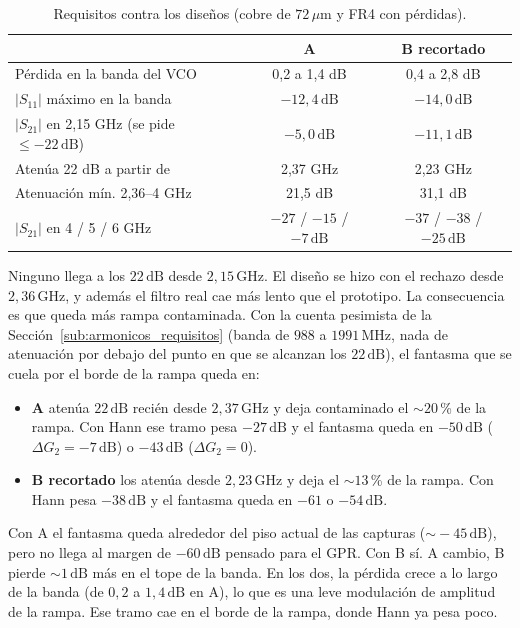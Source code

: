 \begin{table}[htbp]
  \centering
  \caption{Requisitos contra los diseños (cobre de $72\,\mu\text{m}$ y FR4 con
  pérdidas).}
  \label{tab:frf_resultado}
  \begin{tabular}{lcc}
    \toprule
    & A & B recortado \\
    \midrule
    Pérdida en la banda del VCO & 0,2 a 1,4 dB & 0,4 a 2,8 dB \\
    $|S_{11}|$ máximo en la banda & $-12{,}4\,\text{dB}$ & $-14{,}0\,\text{dB}$ \\
    $|S_{21}|$ en 2,15 GHz (se pide $\leq -22\,\text{dB}$) & $-5{,}0\,\text{dB}$ & $-11{,}1\,\text{dB}$ \\
    Atenúa 22 dB a partir de & 2,37 GHz & 2,23 GHz \\
    Atenuación mín. 2,36--4 GHz & 21,5 dB & 31,1 dB \\
    $|S_{21}|$ en 4 / 5 / 6 GHz & $-27$ / $-15$ / $-7\,\text{dB}$ & $-37$ / $-38$ / $-25\,\text{dB}$ \\
    \bottomrule
  \end{tabular}
\end{table}

Ninguno llega a los $22\,\text{dB}$ desde $2{,}15\,\text{GHz}$. El diseño se
hizo con el rechazo desde $2{,}36\,\text{GHz}$, y además el filtro real cae más
lento que el prototipo. La consecuencia es que queda más rampa contaminada.
Con la cuenta pesimista de la Sección~\ref{sub:armonicos_requisitos} (banda de
$988$ a $1991\,\text{MHz}$, nada de atenuación por debajo del punto en que se
alcanzan los $22\,\text{dB}$), el fantasma que se cuela por el borde de la
rampa queda en:
\begin{itemize}
  \item \textbf{A} atenúa $22\,\text{dB}$ recién desde $2{,}37\,\text{GHz}$ y
    deja contaminado el $\sim\!20$\,\% de la rampa. Con Hann ese tramo pesa
    $-27\,\text{dB}$ y el fantasma queda en $-50\,\text{dB}$
    ($\Delta G_2 = -7\,\text{dB}$) o $-43\,\text{dB}$ ($\Delta G_2 = 0$).
  \item \textbf{B recortado} los atenúa desde $2{,}23\,\text{GHz}$ y deja el
    $\sim\!13$\,\% de la rampa. Con Hann pesa $-38\,\text{dB}$ y el fantasma
    queda en $-61$ o $-54\,\text{dB}$.
\end{itemize}
Con A el fantasma queda alrededor del piso actual de las capturas
($\sim\!-45\,\text{dB}$), pero no llega al margen de $-60\,\text{dB}$ pensado
para el GPR. Con B sí. A cambio, B pierde $\sim\!1\,\text{dB}$ más en el tope
de la banda. En los dos, la pérdida crece a lo largo de la banda (de $0{,}2$ a
$1{,}4\,\text{dB}$ en A), lo que es una leve modulación de amplitud de la
rampa. Ese tramo cae en el borde de la rampa, donde Hann ya pesa poco.

